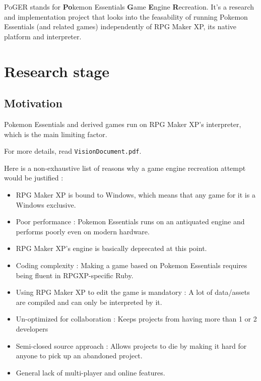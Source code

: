 \documentclass[11pt]{article}
\begin{document}
PoGER stands for \textbf{Po}kemon Essentials \textbf{G}ame \textbf{E}ngine \textbf{R}ecreation. It's a research and implementation project that looks into the feasability of running Pokemon Essentials (and related games) independently of RPG Maker XP, its native platform and interpreter.

\newpage
\section{Research stage}

\subsection{Motivation}

Pokemon Essentials and derived games run on RPG Maker XP's interpreter, which is the main limiting factor.

For more details, read \verb|VisionDocument.pdf|.

Here is a non-exhaustive list of reasons why a game engine recreation attempt would be justified :
\begin{itemize}
	\item RPG Maker XP is bound to Windows, which means that any game for it is a Windows exclusive.
	
	\item Poor performance : Pokemon Essentials runs on an antiquated engine and performs poorly even on modern hardware.
	
	\item RPG Maker XP's engine is basically deprecated at this point.
	
	\item Coding complexity : Making a game based on Pokemon Essentials requires being fluent in RPGXP-specific Ruby.
	
	\item Using RPG Maker XP to edit the game is mandatory : A lot of data/assets are compiled and can only be interpreted by it.
	
	\item Un-optimized for collaboration : Keeps projects from having more than 1 or 2 developers
	
	\item Semi-closed source approach : Allows projects to die by making it hard for anyone to pick up an abandoned project.
	
	\item General lack of multi-player and online features.
\end{itemize}
\end{document}
